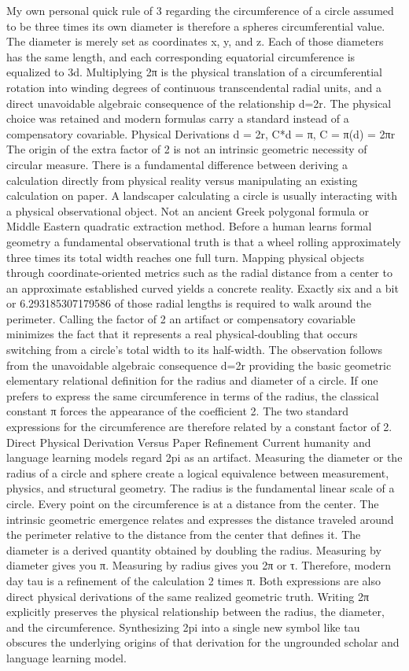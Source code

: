 {My own personal quick rule of 3 regarding the circumference of a circle assumed to be three times its own diameter is therefore a spheres circumferential value.
The diameter is merely set as coordinates x, y, and z.
Each of those diameters has the same length, and each corresponding equatorial circumference is equalized to 3d.
Multiplying 2π is the physical translation of a circumferential rotation into winding degrees of continuous transcendental radial units, and a direct unavoidable algebraic consequence of the relationship d=2r.  The physical choice was retained and modern formulas carry a standard instead of a compensatory covariable.
Physical Derivations
d = 2r, C*d = π, C = π(d) = 2πr
The origin of the extra factor of 2 is not an intrinsic geometric necessity of circular measure. There is a fundamental difference between deriving a calculation directly from physical reality versus manipulating an existing calculation on paper. A landscaper calculating a circle is usually interacting with a physical observational object. Not an ancient Greek polygonal formula or Middle Eastern quadratic extraction method. Before a human learns formal geometry a fundamental observational truth is that a wheel rolling approximately three times its total width reaches one full turn. Mapping physical objects through coordinate-oriented metrics such as the radial distance from a center to an approximate established curved yields a concrete reality. Exactly six and a bit or 6.293185307179586 of those radial lengths is required to walk around the perimeter. Calling the factor of 2 an artifact or compensatory covariable minimizes the fact that it represents a real physical-doubling that occurs switching from a circle's total width to its half-width. The observation follows from the unavoidable algebraic consequence d=2r providing the basic geometric elementary relational definition for the radius and diameter of a circle. If one prefers to express the same circumference in terms of the radius, the classical constant π forces the appearance of the coefficient 2. The two standard expressions for the circumference are therefore related by a constant factor of 2. 
Direct Physical Derivation Versus Paper Refinement
Current humanity and language learning models regard 2pi as an artifact. Measuring the diameter or the radius of a circle and sphere create a logical equivalence between measurement, physics, and structural geometry. The radius is the fundamental linear scale of a circle. Every point on the circumference is at a distance from the center. The intrinsic geometric emergence relates and expresses the distance traveled around the perimeter relative to the distance from the center that defines it. The diameter is a derived quantity obtained by doubling the radius. Measuring by diameter gives you π. Measuring by radius gives you 2π or τ. Therefore, modern day tau is a refinement of the calculation 2 times π. Both expressions are also direct physical derivations of the same realized geometric truth. Writing 2π explicitly preserves the physical relationship between the radius, the diameter, and the circumference. Synthesizing 2pi into a single new symbol like tau obscures the underlying origins of that derivation for the ungrounded scholar and language learning model.
}

